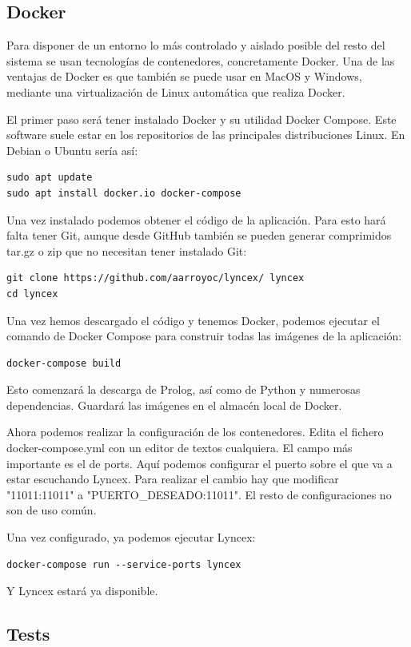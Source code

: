 \documentclass[12pt]{report} %
\begin{document}
\begin{itemize}
\subsection{Docker}

Para disponer de un entorno lo más controlado y aislado posible del resto del sistema se usan tecnologías de contenedores, concretamente Docker. Una de las ventajas de Docker es que también se puede usar en MacOS y Windows, mediante una virtualización de Linux automática que realiza Docker.

El primer paso será tener instalado Docker y su utilidad Docker Compose. Este software suele estar en los repositorios de las principales distribuciones Linux. En Debian o Ubuntu sería así:
\begin{verbatim}
sudo apt update
sudo apt install docker.io docker-compose
\end{verbatim}

Una vez instalado podemos obtener el código de la aplicación. Para esto hará falta tener Git, aunque desde GitHub también se pueden generar comprimidos tar.gz o zip que no necesitan tener instalado Git:
\begin{verbatim}
git clone https://github.com/aarroyoc/lyncex/ lyncex
cd lyncex
\end{verbatim}

Una vez hemos descargado el código y tenemos Docker, podemos ejecutar el comando de Docker Compose para construir todas las imágenes de la aplicación:
\begin{verbatim}
docker-compose build
\end{verbatim}

Esto comenzará la descarga de Prolog, así como de Python y numerosas dependencias. Guardará las imágenes en el almacén local de Docker. 

Ahora podemos realizar la configuración de los contenedores. Edita el fichero docker-compose.yml con un editor de textos cualquiera. El campo más importante es el de ports. Aquí podemos configurar el puerto sobre el que va a estar escuchando Lyncex. Para realizar el cambio hay que modificar "11011:11011" a "PUERTO\_DESEADO:11011". El resto de configuraciones no son de uso común.

Una vez configurado, ya podemos ejecutar Lyncex:
\begin{verbatim}
docker-compose run --service-ports lyncex
\end{verbatim}
Y Lyncex estará ya disponible.

\subsection{Tests}


\end{itemize}
\end{document}
